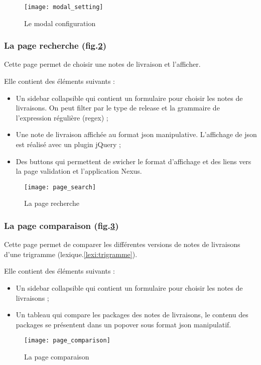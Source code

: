 \begin{figure}[ht]
 \centering
 \texttt{[image: modal\_setting]}
 \caption{Le modal configuration}
 \label{fig:modal_setting}
\end{figure}

\subsubsection{La page recherche (fig.\ref{fig:page_search})}
Cette page permet de choisir une notes de livraison et l'afficher.

Elle contient des éléments suivants :
\begin{itemize}
 \item Un sidebar collapsible qui contient un formulaire pour choisir les notes de livraisons.
       On peut filter par le type de release et la grammaire de l'expression régulière (regex) ;
 \item Une note de livraison affichée au format json manipulative.
       L'affichage de json est réalisé avec un plugin jQuery ;
 \item Des buttons qui permettent de swicher le format d'affichage et des liens vers la page validation et l'application Nexus.
\end{itemize}

\begin{figure}[ht]
 \centering
 \texttt{[image: page\_search]}
 \caption{La page recherche}
 \label{fig:page_search}
\end{figure}

\subsubsection{La page comparaison (fig.\ref{fig:page_comparaison})}
Cette page permet de comparer les différentes versions de notes de livraisons d'une trigramme (lexique.\ref{lexi:trigramme}).

Elle contient des éléments suivants :
\begin{itemize}
 \item Un sidebar collapsible qui contient un formulaire pour choisir les notes de livraisons ;
 \item Un tableau qui compare les packages des notes de livraisons, le contenu des packages se présentent dans un popover sous format json manipulatif.
\end{itemize}

\begin{figure}[ht]
 \centering
 \texttt{[image: page\_comparison]}
 \caption{La page comparaison}
 \label{fig:page_comparaison}
\end{figure}

